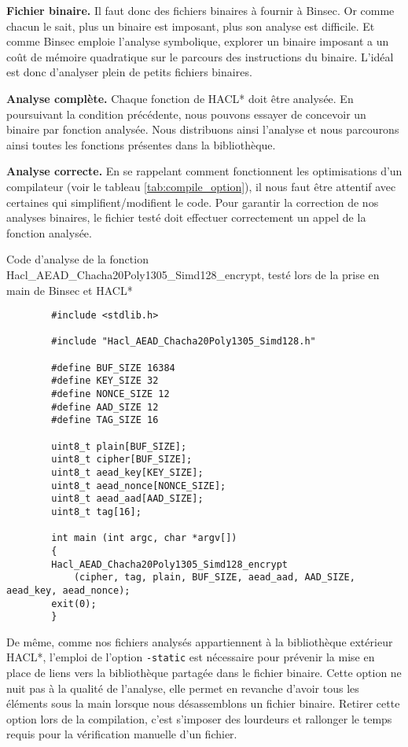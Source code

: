 \textbf{Fichier binaire.} Il faut donc des fichiers binaires à fournir à Binsec. Or comme chacun le sait, plus un binaire est imposant, plus son analyse est difficile. Et comme Binsec emploie l'analyse symbolique, explorer un binaire imposant a un coût de mémoire quadratique sur le parcours des instructions du binaire. L'idéal est donc d'analyser plein de petits fichiers binaires.\smallbreak

\textbf{Analyse complète.} Chaque fonction de HACL* doit être analysée. En poursuivant la condition précédente, nous pouvons essayer de concevoir un binaire par fonction analysée. Nous distribuons ainsi l'analyse et nous parcourons ainsi toutes les fonctions présentes dans la bibliothèque.\medbreak

\textbf{Analyse correcte.} En se rappelant comment fonctionnent les optimisations d'un compilateur (voir le tableau \ref{tab:compile_option}), il nous faut être attentif avec certaines qui simplifient/modifient le code. Pour garantir la correction de nos analyses binaires, le fichier testé doit effectuer correctement un appel de la fonction analysée.

\begin{listing}[!ht]
    \caption{Code d'analyse de la fonction Hacl\_AEAD\_Chacha20Poly1305\_Simd128\-\_encrypt, testé lors de la prise en main de Binsec et HACL*}
    \label{lst:prise_en_main}
    \begin{verbatim}
        #include <stdlib.h>

        #include "Hacl_AEAD_Chacha20Poly1305_Simd128.h"

        #define BUF_SIZE 16384
        #define KEY_SIZE 32
        #define NONCE_SIZE 12
        #define AAD_SIZE 12
        #define TAG_SIZE 16

        uint8_t plain[BUF_SIZE];
        uint8_t cipher[BUF_SIZE];
        uint8_t aead_key[KEY_SIZE];
        uint8_t aead_nonce[NONCE_SIZE];
        uint8_t aead_aad[AAD_SIZE];
        uint8_t tag[16];

        int main (int argc, char *argv[])
        {
        Hacl_AEAD_Chacha20Poly1305_Simd128_encrypt
            (cipher, tag, plain, BUF_SIZE, aead_aad, AAD_SIZE, aead_key, aead_nonce);
        exit(0);
        }
    \end{verbatim}
\end{listing}

De même, comme nos fichiers analysés appartiennent à la bibliothèque extérieur HACL*, l'emploi de l'option \texttt{-static} est nécessaire pour prévenir la mise en place de liens vers la bibliothèque partagée dans le fichier binaire. Cette option ne nuit pas à la qualité de l'analyse, elle permet en revanche d'avoir tous les éléments sous la main lorsque nous désassemblons un fichier binaire. Retirer cette option lors de la compilation, c'est s'imposer des lourdeurs et rallonger le temps requis pour la vérification manuelle d'un fichier.\medbreak

